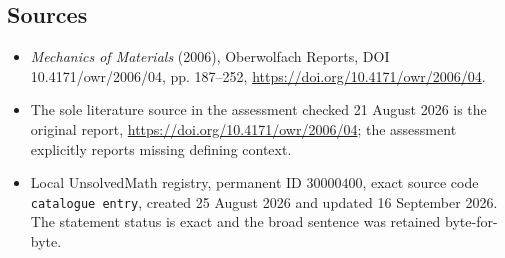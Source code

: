 \documentclass[11pt]{article}
\begin{document}
\subsection{Sources}
\begin{itemize}
\item \emph{Mechanics of Materials} (2006), Oberwolfach Reports, DOI 10.4171/owr/2006/04, pp. 187--252, \url{https://doi.org/10.4171/owr/2006/04}.
\item The sole literature source in the assessment checked 21 August 2026 is the original report, \url{https://doi.org/10.4171/owr/2006/04}; the assessment explicitly reports missing defining context.
\item Local UnsolvedMath registry, permanent ID $30000400$, exact source code \texttt{catalogue entry}, created 25 August 2026 and updated 16 September 2026. The statement status is exact and the broad sentence was retained byte-for-byte.
\end{itemize}
\end{document}
